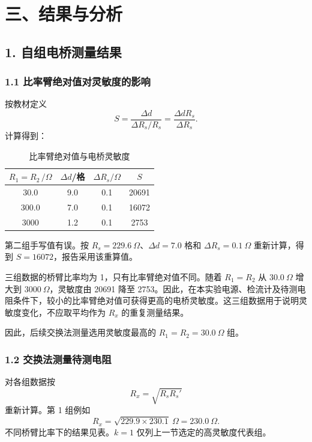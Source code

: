 \section*{三、结果与分析}

\subsection*{1. 自组电桥测量结果}

\subsubsection*{1.1 比率臂绝对值对灵敏度的影响}

按教材定义
\begin{equation}
  S=\frac{\Delta d}{\Delta R_s/R_s}
  =\frac{\Delta dR_s}{\Delta R_s}.
\end{equation}
计算得到：

\begin{table}[H]
  \centering
  \small
  \caption{比率臂绝对值与电桥灵敏度}
  \begin{tabular}{cccc}
    \toprule
    $R_1=R_2\,/\Omega$ & $\Delta d$/格 & $\Delta R_s/\Omega$ & $S$ \\
    \midrule
    30.0 & 9.0 & 0.1 & 20691 \\
    300.0 & 7.0 & 0.1 & 16072 \\
    3000 & 1.2 & 0.1 & 2753 \\
    \bottomrule
  \end{tabular}
\end{table}

第二组手写值有误。按 $R_s=229.6\ \Omega$、$\Delta d=7.0$ 格和 $\Delta R_s=0.1\ \Omega$ 重新计算，得到 $S=16072$，报告采用该重算值。

三组数据的桥臂比率均为 1，只有比率臂绝对值不同。随着 $R_1=R_2$ 从 $30.0\ \Omega$ 增大到 $3000\ \Omega$，灵敏度由 20691 降至 2753。因此，在本实验电源、检流计及待测电阻条件下，较小的比率臂绝对值可获得更高的电桥灵敏度。这三组数据用于说明灵敏度变化，不应取平均作为 $R_x$ 的重复测量结果。

因此，后续交换法测量选用灵敏度最高的 $R_1=R_2=30.0\ \Omega$ 组。

\subsubsection*{1.2 交换法测量待测电阻}

对各组数据按
\begin{equation}
  R_x=\sqrt{R_sR_s'}
\end{equation}
重新计算。第 1 组例如
\begin{equation}
  R_x=\sqrt{229.9\times230.1}\ \Omega
  =230.0\ \Omega.
\end{equation}
不同桥臂比率下的结果见表。$k=1$ 仅列上一节选定的高灵敏度代表组。

